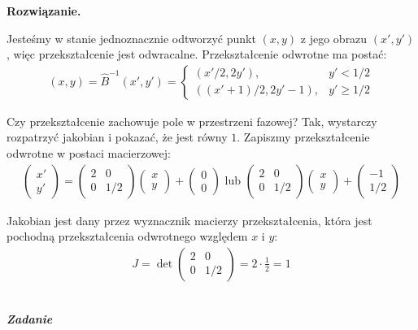 \documentclass[11pt,a4paper]{article}
\newcounter{zadanie}\newcommand{\zadanie}[1][]{\addtocounter{zadanie}{1} ~\\  {\bf \emph{Zadanie \arabic{zadanie} #1 }} \\}
\newenvironment{solution}{\vspace{1cm} \par\textbf{Rozwiązanie.} \vspace{1cm}}{}
\begin{document}
\begin{solution}

Jesteśmy w stanie jednoznacznie odtworzyć punkt $(x, y)$ z jego obrazu $(x', y')$, 
więc przekształcenie jest odwracalne. Przekształcenie odwrotne ma postać:
\begin{align*}
(x, y) = \hat{B}^{-1}(x', y') = \begin{cases} (x'/2, 2y'), & y' < 1/2 \\ ((x'+1)/2, 2y' - 1), & y' \geq 1/2 \end{cases}
\end{align*}

Czy przekształcenie zachowuje pole w przestrzeni fazowej? 
Tak, wystarczy rozpatrzyć jakobian i pokazać, że jest równy $1$.
Zapiszmy przekształcenie odwrotne w postaci macierzowej:
\begin{align*}
\left( \begin{array}{c} x' \\ y' \end{array} \right) = \left( \begin{array}{cc} 2 & 0 \\
0 & 1/2 \end{array} \right) \left( \begin{array}{c} x \\ y \end{array} \right) + 
\left( \begin{array}{c} 0 \\ 0 \end{array} \right) \text{ lub } \left( \begin{array}{cc} 2 & 0 \\ 0 & 1/2 \end{array} \right) \left( \begin{array}{c} x \\ y \end{array} \right) + \left( \begin{array}{c} -1 \\ 1/2 \end{array} \right)
\end{align*}

Jakobian jest dany przez wyznacznik macierzy przekształcenia, 
która jest pochodną przekształcenia odwrotnego względem $x$ i $y$:
\begin{align*}
J = \det \left( \begin{array}{cc} 2 & 0 \\
0 & 1/2 \end{array} \right) = 2 \cdot \frac{1}{2} = 1
\end{align*}


\newpage
\end{solution}
\zadanie[]
\end{document}
